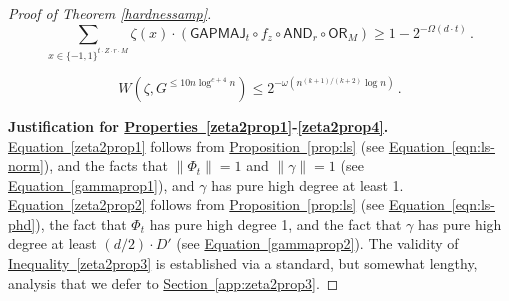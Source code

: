 \documentclass[11pt]{article}
\numberwithin{equation}{section}
\theoremstyle{definition}
\theoremstyle{plain}
\newcommand{\expref}[2]{\hyperref[#2]{#1~\ref{#2}}}
\newcommand{\expeqref}[2]{\hyperref[#2]{#1~\eqref{#2}}}
\newcommand{\OR}{\mathsf{ OR}}
\newcommand{\GAPMAJ}{\mathsf{GAPMAJ}}
\newcommand{\bits}{\{-1,1\}}
\newcommand{\AND}{\mathsf{AND}}
\begin{document}
\begin{proof}[Proof of Theorem \ref{hardnessamp}]
	\begin{equation}\label{zeta2prop3}
	\sum_{x\in\bits^{t \cdot Z \cdot r \cdot M}} \zeta(x) \cdot \left(\GAPMAJ_t \circ f_z \circ \AND_{r} \circ \OR_M\right)  \geq 1-2^{-\Omega(d\cdot t)}\,.
	\end{equation}
	
	\begin{equation} \label{zeta2prop4}
	W(\zeta, G^{\leq 10 n \log^{c + 4} n}) \leq 2^{-\omega(n^{(k+1)/(k+2)} \log n)}\,.
	\end{equation}
	
	\medskip \noindent \textbf{Justification for \expeqref{Properties}{zeta2prop1}-\eqref{zeta2prop4}.}
	\expeqref{Equation}{zeta2prop1} follows from \expref{Proposition}{prop:ls} (see  \expeqref{Equation}{eqn:ls-norm}), and 
	the facts that $\|\Phi_t\|=1$ and $\|\gamma\|=1$ (see  \expeqref{Equation}{gammaprop1}), and $\gamma$ has pure high degree at least 1.
	\expeqref{Equation}{zeta2prop2} follows from \expref{Proposition}{prop:ls} (see  \expeqref{Equation}{eqn:ls-phd}), 
	the fact that $\Phi_t$ has pure high degree 1, and the fact that $\gamma$ has pure high degree at least $(d/2) \cdot D'$ (see  \expeqref{Equation}{gammaprop2}).
	The validity of \expeqref{Inequality}{zeta2prop3} is established via a standard, but somewhat lengthy, analysis that we
	defer to \expref{Section}{app:zeta2prop3}.
	

\end{proof}
\end{document}
